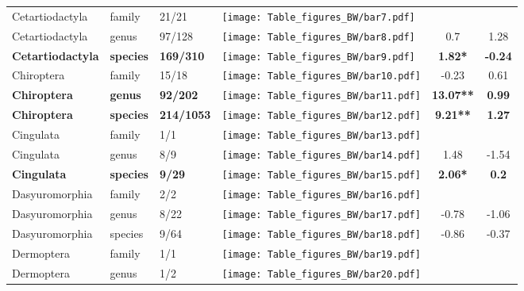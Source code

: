 \begin{longtable}{lL{1.8cm}C{2cm}lcc}
  Cetartiodactyla & family & 21/21 & \texttt{[image: Table\_figures\_BW/bar7.pdf]} &   &   \\ 
  Cetartiodactyla & genus & 97/128 & \texttt{[image: Table\_figures\_BW/bar8.pdf]} & 0.7 & 1.28 \\ 
  \textbf{Cetartiodactyla} & \textbf{species} & \textbf{169/310} & \texttt{[image: Table\_figures\_BW/bar9.pdf]} & \textbf{1.82*} & \textbf{-0.24} \\ 
  Chiroptera & family & 15/18 & \texttt{[image: Table\_figures\_BW/bar10.pdf]} & -0.23 & 0.61 \\ 
  \textbf{Chiroptera} & \textbf{genus} & \textbf{92/202} & \texttt{[image: Table\_figures\_BW/bar11.pdf]} & \textbf{13.07**} & \textbf{0.99} \\ 
  \textbf{Chiroptera} & \textbf{species} & \textbf{214/1053} & \texttt{[image: Table\_figures\_BW/bar12.pdf]} & \textbf{9.21**} & \textbf{1.27} \\ 
  Cingulata & family & 1/1 & \texttt{[image: Table\_figures\_BW/bar13.pdf]} &   &   \\ 
  Cingulata & genus & 8/9 & \texttt{[image: Table\_figures\_BW/bar14.pdf]} & 1.48 & -1.54 \\ 
  \textbf{Cingulata} & \textbf{species} & \textbf{9/29} & \texttt{[image: Table\_figures\_BW/bar15.pdf]} & \textbf{2.06*} & \textbf{0.2} \\ 
  Dasyuromorphia & family & 2/2 & \texttt{[image: Table\_figures\_BW/bar16.pdf]} &   &   \\ 
  Dasyuromorphia & genus & 8/22 & \texttt{[image: Table\_figures\_BW/bar17.pdf]} & -0.78 & -1.06 \\ 
  Dasyuromorphia & species & 9/64 & \texttt{[image: Table\_figures\_BW/bar18.pdf]} & -0.86 & -0.37 \\ 
  Dermoptera & family & 1/1 & \texttt{[image: Table\_figures\_BW/bar19.pdf]} &   &   \\ 
  Dermoptera & genus & 1/2 & \texttt{[image: Table\_figures\_BW/bar20.pdf]} &   &   \\ 

\end{longtable}
